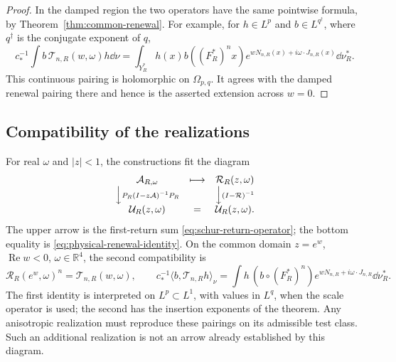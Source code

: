 \begin{proof}
In the damped region the two operators have the same pointwise formula,
by Theorem~\ref{thm:common-renewal}. For example, for $h\in L^p$ and
$b\in L^{q^\dagger}$, where $q^\dagger$ is the conjugate exponent of $q$,
\[
 c_*^{-1}\int b\,\mathcal T_{n,R}(w,\omega)h\dd\nu
 =\int_{Y_R^*}h(x)b((F_R^*)^nx)
       e^{wN_{n,R}(x)+i\omega\cdot J_{n,R}(x)}\dd\nu_R^*.
\]
This continuous pairing is holomorphic on $\Omega_{p,q}$. It agrees
with the damped renewal pairing there and hence is the asserted
extension across $w=0$.
\end{proof}

\subsection*{Compatibility of the realizations}
For real $\omega$ and $|z|<1$, the constructions fit the diagram
\[
 \begin{array}{ccc}
 \mathcal A_{R,\omega}&\longmapsto&\mathcal R_R(z,\omega)\\
 \Big\downarrow {\scriptstyle P_R(I-z\mathcal A)^{-1}P_R}
 &&\Big\downarrow {\scriptstyle (I-\mathcal R)^{-1}}\\
 \mathcal U_R(z,\omega)&=&\mathcal U_R(z,\omega).
 \end{array}
\]
The upper arrow is the first-return sum
\eqref{eq:schur-return-operator}; the bottom equality is
\eqref{eq:physical-renewal-identity}. On the common domain
$z=e^w$, $\operatorname{Re}w<0$, $\omega\in\mathbb R^4$, the second
compatibility is
\[
 \mathcal R_R(e^w,\omega)^n=\mathcal T_{n,R}(w,\omega),\qquad
 c_*^{-1}\langle b,\mathcal T_{n,R}h\rangle_\nu
 =\int h\,(b\circ(F_R^*)^n)e^{wN_{n,R}+i\omega\cdot J_{n,R}}
                        \dd\nu_R^*.
\]
The first identity is interpreted on $L^p\subset L^1$, with values in
$L^q$, when the scale operator is used; the second has the insertion
exponents of the theorem. Any anisotropic realization must reproduce
these pairings on its admissible test class. Such an additional
realization is not an arrow already established by this diagram.

